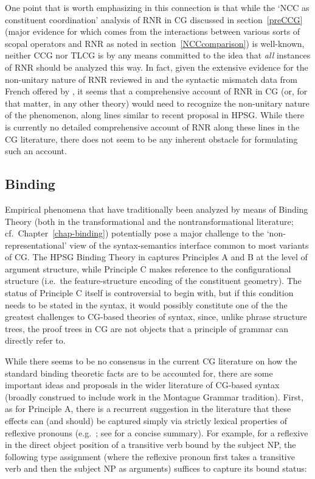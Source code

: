 \documentclass[output=paper]{langsci/langscibook}
\begin{document}
One point that is worth emphasizing in this connection is that
while the `NCC as constituent coordination' analysis of RNR in CG
discussed in section~\ref{preCCG} (major evidence for which comes from the
interactions between various sorts of scopal operators and RNR as
noted in section~\ref{NCCcomparison}) is well-known, neither CCG nor TLCG is by
any means committed to the idea that \emph{all} instances of RNR should be
analyzed this way.
In fact, given the extensive evidence for the non-unitary nature of
RNR reviewed in \citet{Chaves2014a-u} and the syntactic mismatch data from
French offered by \citet{ACS2016a-u},  it seems
that a comprehensive account of RNR in CG (or, for that matter, in any
other theory) would need to recognize the
non-unitary nature of the phenomenon, along lines similar to
 recent proposal in HPSG. While there is currently no
detailed comprehensive account of RNR along these lines in the
CG literature, there does not  seem to be any inherent 
obstacle for formulating such an account.


\subsection{Binding}

Empirical phenomena that have traditionally been analyzed by means of
Binding Theory (both in the transformational and the
nontransformational literature; cf.~Chapter~\ref{chap-binding})
potentially pose a major challenge to the
`non-representational' view of the syntax-semantics interface common
to most variants of CG. The HPSG Binding Theory in \citet{ps2}
captures Principles A and B at the level of argument structure, while
Principle C makes reference to the configurational structure (i.e.\
the feature-structure encoding of the constituent geometry). The
status of Principle C itself is controversial to begin with, but if
this condition needs to be stated in the syntax, it would possibly
constitute one of the the greatest challenges to CG-based theories of
syntax, since, unlike phrase structure trees, the proof trees in CG
are not objects that a principle of grammar can directly refer to.

While there seems to be no consensus in the current CG literature on
how the standard binding theoretic facts are to be accounted for, there are
some important ideas and proposals in the wider literature of CG-based
syntax (broadly construed to include work in the Montague Grammar
tradition). First, as for Principle A, there is a recurrent suggestion
in the literature that these effects can (and should) be captured
simply via strictly lexical properties of reflexive pronouns
(e.g.\  \citet{szabolcsi1992}; see \citet{buringbinding} for a concise summary).
For example, for a reflexive in the direct object position
of a transitive verb bound by the subject NP,
the following type assignment (where the reflexive pronoun first takes
a transitive verb and then the subject NP as arguments) suffices to
capture its bound status:
\end{document}
